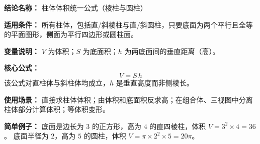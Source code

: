 \textbf{结论名称：} 柱体体积统一公式（棱柱与圆柱）

\textbf{适用条件：} 所有柱体，包括直/斜棱柱与直/斜圆柱，只要底面为两个平行且全等的平面图形，侧面为平行四边形或圆柱面。

\textbf{变量说明：} \(V\) 为体积；\(S\) 为底面积；\(h\) 为两底面间的垂直距离（高）。

\textbf{核心公式：}
\[
\boxed{V = S\,h}
\]
该公式对直柱体与斜柱体均成立，\(h\) 是垂直高度而非侧棱长。

\textbf{使用场景：} 直接求柱体体积；由体积和底面积反求高；在组合体、三视图中分离柱体部分计算体积；等体积变形。

\textbf{简单例子：}
底面是边长为 \(3\) 的正方形，高为 \(4\) 的直四棱柱，体积 \(V = 3^2 \times 4 = 36\)。
底面半径为 \(2\)，高为 \(5\) 的圆柱，体积 \(V = \pi \times 2^2 \times 5 = 20\pi\)。